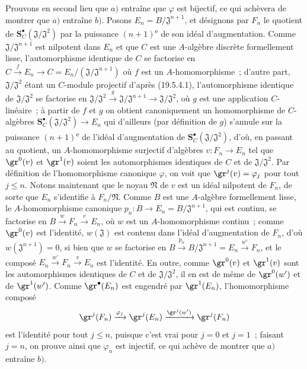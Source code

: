 \begin{env}[19.5.4.2]
\label{0.19.5.4.2-fr}
Prouvons en second lieu que $a)$ entraîne que $\varphi$ est bijectif, ce qui
achèvera de montrer que $a)$ entraîne $b)$. Posons
$E_n=B/\mathfrak J^{n+1}$, et désignons par $F_n$ le quotient de
$\mathbf S_C^\bullet(\mathfrak J/\mathfrak J^2)$ par la puissance $(n+1)$\textsuperscript{e} de
son idéal d'augmentation. Comme $\mathfrak J/\mathfrak J^{n+1}$ est nilpotent
dans $E_n$ et que $C$ est une $A$-algèbre discrète formellement lisse,
l'automorphisme identique de $C$ se factorise en
$C\xrightarrow{f}E_n\to C=E_n/(\mathfrak J/\mathfrak J^{n+1})$ où $f$ est un
$A$-homomorphisme~; d'autre part, $\mathfrak J/\mathfrak J^2$ étant un
$C$-module projectif d'après (19.5.4.1), l'automorphisme identique de
$\mathfrak J/\mathfrak J^2$ se factorise en
$\mathfrak J/\mathfrak J^2\xrightarrow{g}\mathfrak J/\mathfrak J^{n+1}
\to\mathfrak J/\mathfrak J^2$, où $g$ est une application $C$-linéaire~; à
partir de $f$ et $g$ on obtient canoniquement un homomorphisme de $C$-algèbres
$\mathbf S_C^\bullet(\mathfrak J/\mathfrak J^2)\to E_n$ qui d'ailleurs (par
définition de $g$) s'annule sur la puissance $(n+1)$\textsuperscript{e} de l'idéal
d'augmentation de $\mathbf S_C^\bullet(\mathfrak J/\mathfrak J^2)$, d'où, en
passant au quotient, un $A$-homomorphisme surjectif d'algèbres
$v:F_n\to E_n$ tel que $\gr^0(v)$ et $\gr^1(v)$ soient les automorphismes
identiques de $C$ et de $\mathfrak J/\mathfrak J^2$. Par définition de
l'homomorphisme canonique $\varphi$, on voit que $\gr^j(v)=\varphi_j$ pour tout
$j\leq n$. Notons maintenant que le noyau $\mathfrak N$ de $v$ est un idéal
nilpotent de $F_n$, de sorte que $E_n$ s'identifie à $F_n/\mathfrak N$. Comme
$B$ est une $A$-algèbre formellement lisse, le $A$-homomorphisme canonique
$p_n:B\to E_n=B/\mathfrak J^{n+1}$, qui est continu, se factorise en
$B\xrightarrow{w}F_n\xrightarrow{v}E_n$, où $w$ est un $A$-homomorphisme
continu~; comme $\gr^0(v)$ est l'identité, $w(\mathfrak J)$ est contenu dans
l'idéal d'augmentation de $F_n$, d'où $w(\mathfrak J^{n+1})=0$, si bien que
$w$ se factorise en
$B\xrightarrow{p_n}B/\mathfrak J^{n+1}=E_n\xrightarrow{w'}F_n$, et le composé
$E_n\xrightarrow{w'}F_n\xrightarrow{v}E_n$ est l'identité. En outre, comme
$\gr^0(v)$ et $\gr^1(v)$ sont les automorphismes identiques de $C$ et de
$\mathfrak J/\mathfrak J^2$, il en est de même de $\gr^0(w')$ et de
$\gr^1(w')$. Comme $\gr^\bullet(E_n)$ est engendré par $\gr^1(E_n)$,
l'homomorphisme composé
\[
  \gr^j(F_n)\xrightarrow{\varphi_j}\gr^j(E_n)
  \xrightarrow{\gr^j(w')}\gr^j(F_n)
\]
est l'identité pour tout $j\leq n$, puisque c'est vrai pour $j=0$ et $j=1$~;
faisant $j=n$, on prouve ainsi que $\varphi_n$ est injectif, ce qui achève de
montrer que $a)$ entraîne $b)$.
\end{env}

